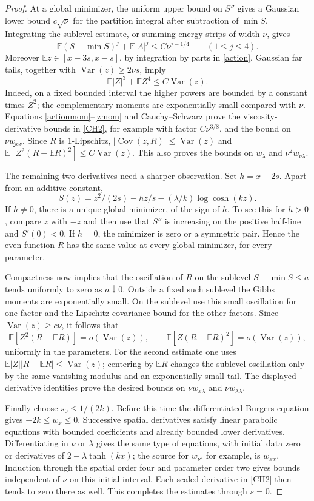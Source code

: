 \documentclass[11pt]{article}
\newcommand{\E}{\mathbb E}
\DeclareMathOperator{\Var}{Var}
\DeclareMathOperator{\Cov}{Cov}
\begin{document}
\begin{proof}
At a global minimizer, the uniform upper bound on $S''$ gives a Gaussian lower bound $c\sqrt\nu$ for the partition integral after subtraction of $\min S$. Integrating the sublevel estimate, or summing energy strips of width $\nu$, gives
\begin{equation}\label{actionmom}
\E(S-\min S)^j+\E|A|^j\le C\nu^{j-1/4}\qquad(1\le j\le4).
\end{equation}
Moreover $\E z\in[x-3s,x-s]$, by integration by parts in \eqref{action}. Gaussian far tails, together with $\Var(z)\ge2\nu s$, imply
\begin{equation}\label{zmom}
 \E|Z|^3+\E Z^4\le C\Var(z).
\end{equation}
Indeed, on a fixed bounded interval the higher powers are bounded by a constant times $Z^2$; the complementary moments are exponentially small compared with $\nu$. Equations \eqref{actionmom}--\eqref{zmom} and Cauchy--Schwarz prove the viscosity-derivative bounds in \eqref{CH2}, for example with factor $C\nu^{3/8}$, and the bound on $\nu w_{xx}$. Since $R$ is $1$-Lipschitz, $|\Cov(z,R)|\le\Var(z)$ and $\E[Z^2(R-\E R)^2]\le C\Var(z)$. This also proves the bounds on $w_\lambda$ and $\nu^2w_{\nu\lambda}$.

The remaining two derivatives need a sharper observation. Set $h=x-2s$. Apart from an additive constant,
\[
 S(z)=z^2/(2s)-hz/s-(\lambda/k)\log\cosh(kz).
\]
If $h\ne0$, there is a unique global minimizer, of the sign of $h$. To see this for $h>0$, compare $z$ with $-z$ and then use that $S''$ is increasing on the positive half-line and $S'(0)<0$. If $h=0$, the minimizer is zero or a symmetric pair. Hence the even function $R$ has the same value at every global minimizer, for every parameter.

Compactness now implies that the oscillation of $R$ on the sublevel $S-\min S\le a$ tends uniformly to zero as $a\downarrow0$. Outside a fixed such sublevel the Gibbs moments are exponentially small. On the sublevel use this small oscillation for one factor and the Lipschitz covariance bound for the other factors. Since $\Var(z)\ge c\nu$, it follows that
\[
 \E[Z^2(R-\E R)]=o(\Var(z)),\qquad
 \E[Z(R-\E R)^2]=o(\Var(z)),
\]
uniformly in the parameters. For the second estimate one uses
$\E|Z||R-\E R|\le\Var(z)$; centering by $\E R$ changes the sublevel oscillation only by the same vanishing modulus and an exponentially small tail. The displayed derivative identities prove the desired bounds on $\nu w_{x\lambda}$ and $\nu w_{\lambda\lambda}$.

Finally choose $s_0\le1/(2k)$. Before this time the differentiated Burgers equation gives $-2k\le w_x\le0$. Successive spatial derivatives satisfy linear parabolic equations with bounded coefficients and already bounded lower derivatives. Differentiating in $\nu$ or $\lambda$ gives the same type of equations, with initial data zero or derivatives of $2-\lambda\tanh(kx)$; the source for $w_\nu$, for example, is $w_{xx}$. Induction through the spatial order four and parameter order two gives bounds independent of $\nu$ on this initial interval. Each scaled derivative in \eqref{CH2} then tends to zero there as well. This completes the estimates through $s=0$.
\end{proof}
\end{document}
